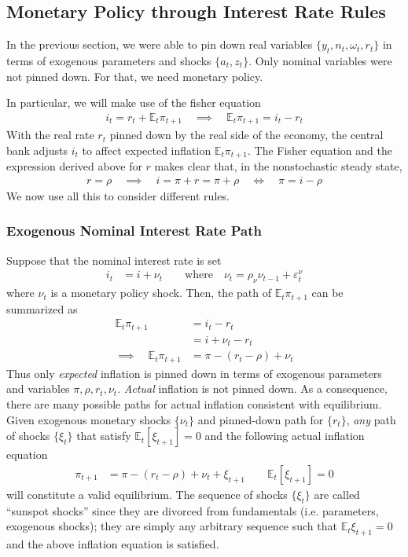 \documentclass[12pt]{article}
\theoremstyle{plain}
\theoremstyle{definition}
\theoremstyle{remark}
\newcommand{\E}{\mathbb{E}}
\begin{document}
\subsection{Monetary Policy through Interest Rate Rules}

In the previous section, we were able to pin down real variables
$\{y_t,n_t,\omega_t,r_t\}$ in terms of exogenous parameters and shocks
$\{a_t,z_t\}$. Only nominal variables were not pinned down. For that, we
need monetary policy.

In particular, we will make use of the fisher equation
\begin{align*}
  i_t = r_t + \E_t\pi_{t+1}
  \quad\implies\quad
  \E_t\pi_{t+1} = i_t - r_t
\end{align*}
With the real rate $r_t$ pinned down by the real side of the economy,
the central bank adjusts $i_t$ to affect expected inflation
$\E_t\pi_{t+1}$.
The Fisher equation and the expression derived above for $r$ makes clear
that, in the nonstochastic steady state,
\begin{align*}
  r = \rho
  \quad\implies\quad
  i = \pi + r = \pi + \rho
  \quad\iff\quad
  \pi = i - \rho
\end{align*}
We now use all this to consider different rules.

\subsubsection{Exogenous Nominal Interest Rate Path}

Suppose that the nominal interest rate is set
\begin{align*}
  i_t &= i + \nu_t
  \qquad\text{where}\quad
  \nu_t = \rho_\nu \nu_{t-1}+\varepsilon_t^\nu
\end{align*}
where $\nu_t$ is a monetary policy shock. Then, the path of
$\E_t\pi_{t+1}$ can be summarized as
\begin{align*}
  \E_t\pi_{t+1} &= i_t - r_t
  \\
  &= i + \nu_t - r_t \\
  \implies\quad
  \E_t\pi_{t+1}
  &= \pi - (r_t-\rho) + \nu_t
\end{align*}
Thus only \emph{expected} inflation is pinned down in terms of
exogenous parameters and variables $\pi,\rho,r_t,\nu_t$.
\emph{Actual} inflation is not pinned down. As a consequence, there are
many possible paths for actual inflation consistent with equilibrium.
Given exogenous monetary shocks $\{\nu_t\}$ and pinned-down path for
$\{r_t\}$,
\emph{any} path of shocks $\{\xi_t\}$ that satisfy $\E_t[\xi_{t+1}]=0$
and the following actual inflation equation
\begin{align*}
  \pi_{t+1}
  &= \pi - (r_t-\rho) + \nu_t  + \xi_{t+1}
  \qquad \E_t[\xi_{t+1}]=0
\end{align*}
will constitute a valid equilibrium.
The sequence of shocks $\{\xi_t\}$ are called ``sunspot shocks'' since
they are divorced from fundamentals (i.e. parameters, exogenous shocks);
they are simply any arbitrary sequence such that $\E_t\xi_{t+1}=0$ and
the above inflation equation is satisfied.
\end{document}
